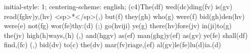 initial-style: 1;
centering-scheme: english;
(c4)The(df) wed(dc)ding(fv) is(gv) read(fghv)y,(hv) <sp>*</sp>(,) but(f) they(gh) who(g) were(f) bid(gh)den(hv) were(e) not(fg) wor(fe)thy:(d) (;) go(hviji) ye(g) there(hv)fore(jv) in(ji)to(g) the(jv) high(h)ways,(h) (,) and(hggv) as(ef) man(ghg)y(ef) as(gv) ye(fe) shall(df) find,(fc) (,) bid(dv) to(c) the(dv) mar(fv)riage,(ef) al(gv)le(fe)lu(d)ia.(d)
